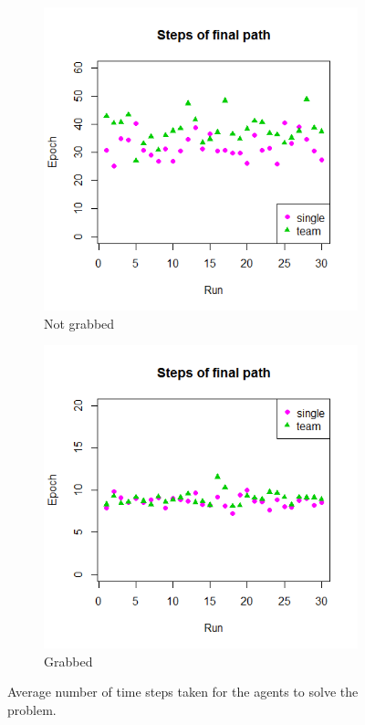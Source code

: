 \begin{figure}
	\centering	
	\begin{subfigure}{.48\textwidth}
		\centering
		\includegraphics[width=\textwidth]{images/Path_notgrabbed.png}
		\caption{Not grabbed}
		\label{4c}		
	\end{subfigure}
	\begin{subfigure}{0.48\textwidth}
		\centering
		\includegraphics[width=\textwidth]{images/Path_grabbed.png}
		\caption{Grabbed}
		\label{4d}		
	\end{subfigure}
	\caption{Average number of time steps taken for the agents to solve the problem.}
	\label{fig:Results4}
\end{figure}


